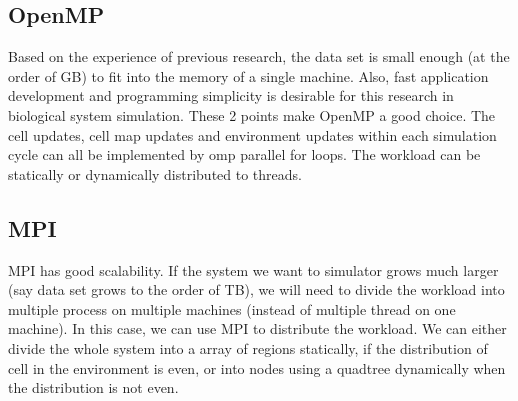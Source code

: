 \documentclass[12pt]{article}
\begin{document}
\subsection{OpenMP}
Based on the experience of previous research, the data set is small enough (at the order of GB) to fit into the memory of a single machine. Also, fast application development and programming simplicity is desirable for this research in biological system simulation. These 2 points make OpenMP a good choice. The cell updates, cell map updates and environment updates within each simulation cycle can all be implemented by omp parallel for loops. The workload can be statically or dynamically distributed to threads.
\subsection{MPI}
MPI has good scalability. If the system we want to simulator grows much larger (say data set grows to the order of TB), we will need to divide the workload into multiple process on multiple machines (instead of multiple thread on one machine). In this case, we can use MPI to distribute the workload. We can either divide the whole system into a array of regions statically, if the distribution of cell in the environment is even, or into nodes using a quadtree dynamically when the distribution is not even.

\end{document}
